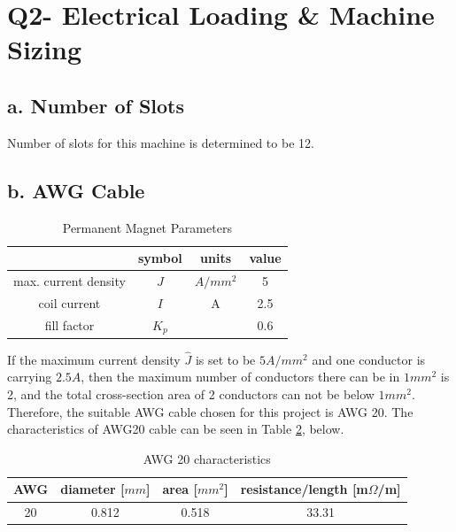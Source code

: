 \documentclass[a4paper, 11pt, titlepage]{article}
\begin{document}
\section{Q2- Electrical Loading \& Machine Sizing}
\label{sec:Q2}

\subsection{a. Number of Slots}

Number of slots for this machine is determined to be 12.


\subsection{b. AWG Cable}

\begin{table}[h]
	\begin{center}
		\begin{tabular}{c|c|c|c}
			 & symbol & units & value \\
			\hline
			max. current density & $J$ & $A/mm^2$ & 5 \\
			coil current & $I$ & A & 2.5 \\ 
			fill factor & $K_p$ & & 0.6 \\
			\hline
		\end{tabular}
	\end{center}
	\caption{Permanent Magnet Parameters}
	\label{fig:PMParameters}
\end{table}


If the maximum current density $\hat{J}$ is set to be $5 A/mm^2$ and one conductor is carrying $2.5A$, then the maximum number of conductors there can be in $1mm^2$ is 2, and the total cross-section area of 2 conductors can not be below $1mm^2$. Therefore, the suitable AWG cable chosen for this project is AWG 20. The characteristics of AWG20 cable can be seen in Table \ref{tab:AWG20}, below.

\begin{table}[h]
	\begin{center}
		\begin{tabular}{c|c|c|c}
			AWG & diameter [$mm$] & area [$mm^2$] & resistance/length [m$\Omega$/m] \\
			\hline
			20 &  0.812 & 0.518 & 33.31 \\
			\hline
		\end{tabular}
	\end{center}
	\caption{AWG 20 characteristics}
	\label{tab:AWG20}
\end{table}
\end{document}
